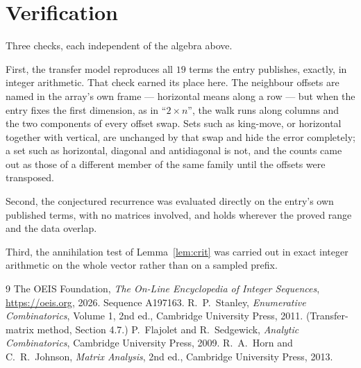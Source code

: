 \documentclass[11pt,a4paper]{article}
\theoremstyle{plain}
\theoremstyle{definition}
\begin{document}
\section{Verification}

Three checks, each independent of the algebra above.

First, the transfer model reproduces all $19$ terms the entry publishes, exactly, in
integer arithmetic. That check earned its place here. The neighbour offsets are named in the
array's own frame --- horizontal means along a row --- but when the entry fixes the first
dimension, as in ``$2\times n$'', the walk runs along columns and the two components of every
offset swap. Sets such as king-move, or horizontal together with vertical, are unchanged by
that swap and hide the error completely; a set such as horizontal, diagonal and antidiagonal
is not, and the counts came out as those of a different member of the same family until the
offsets were transposed.

Second, the conjectured recurrence was evaluated directly on the entry's own published terms,
with no matrices involved, and holds wherever the proved range and the data overlap.

Third, the annihilation test of Lemma~\ref{lem:crit} was carried out in exact integer
arithmetic on the whole vector rather than on a sampled prefix.

\begin{thebibliography}{9}
 The OEIS Foundation, \emph{The On-Line Encyclopedia of Integer
Sequences}, \url{https://oeis.org}, 2026. Sequence A197163.
 R.~P.~Stanley, \emph{Enumerative Combinatorics}, Volume 1, 2nd ed.,
Cambridge University Press, 2011. (Transfer-matrix method, Section 4.7.)
 P.~Flajolet and R.~Sedgewick, \emph{Analytic Combinatorics}, Cambridge
University Press, 2009.
 R.~A.~Horn and C.~R.~Johnson, \emph{Matrix Analysis}, 2nd ed., Cambridge
University Press, 2013.
\end{thebibliography}
\end{document}
